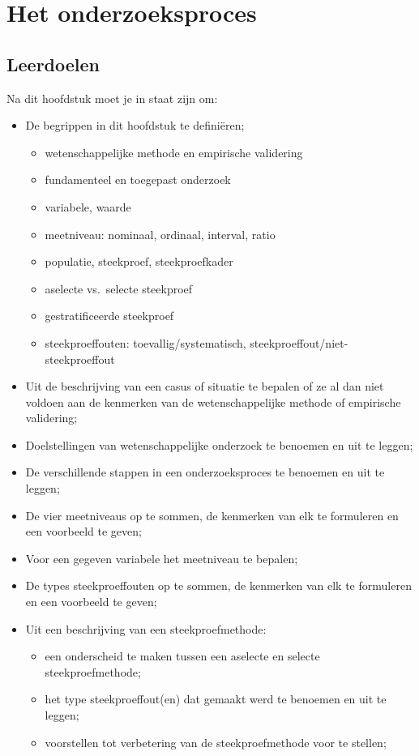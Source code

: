 \chapter{Het onderzoeksproces}
\label{ch:onderzoeksproces}

\section{Leerdoelen}
\label{sec:onderzoeksproces-leerdoelen}

Na dit hoofdstuk moet je in staat zijn om:

\begin{itemize}
  \item De begrippen in dit hoofdstuk te definiëren;
    \begin{itemize}
      \item wetenschappelijke methode en empirische validering
      \item fundamenteel en toegepast onderzoek
      \item variabele, waarde
      \item meetniveau: nominaal, ordinaal, interval, ratio
      \item populatie, steekproef, steekproefkader
      \item aselecte vs.~selecte steekproef
      \item gestratificeerde steekproef
      \item steekproeffouten: toevallig/systematisch, steekproeffout/niet-steekproeffout
    \end{itemize}
  \item Uit de beschrijving van een casus of situatie te bepalen of ze al dan niet voldoen aan de kenmerken van de wetenschappelijke methode of empirische validering;
  \item Doelstellingen van wetenschappelijke onderzoek te benoemen en uit te leggen;
  \item De verschillende stappen in een onderzoeksproces te benoemen en uit te leggen;
  \item De vier meetniveaus op te sommen, de kenmerken van elk te formuleren en een voorbeeld te geven;
  \item Voor een gegeven variabele het meetniveau te bepalen;
  \item De types steekproeffouten op te sommen, de kenmerken van elk te formuleren en een voorbeeld te geven;
  \item Uit een beschrijving van een steekproefmethode:
    \begin{itemize}
      \item een onderscheid te maken tussen een aselecte en selecte steekproefmethode;
      \item het type steekproeffout(en) dat gemaakt werd te benoemen en uit te leggen;
      \item voorstellen tot verbetering van de steekproefmethode voor te stellen;
    \end{itemize}
\end{itemize}

